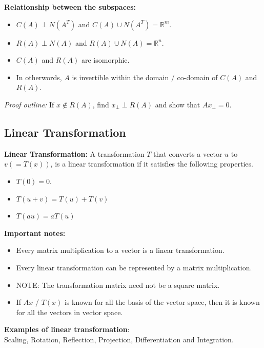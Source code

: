\begin{mdframed}[backgroundcolor=SlateGray2!40,linecolor=Firebrick4]
\textbf{Relationship between the subspaces:}
\begin{itemize}
	\item $C(A) \perp N(A^T)$ and $C(A) \cup N(A^T) = \mathbb{R}^m$.
	\item $R(A) \perp N(A)$ and $R(A) \cup N(A) = \mathbb{R}^n$.
    \item $C(A)$ and $R(A)$ are isomorphic.
    \item In otherwords, $A$ is invertible within the domain / co-domain of 
            $C(A)$ and $R(A)$.
\end{itemize}
\textit{Proof outline:} If $x \notin R(A)$, find $x_{\perp} \perp R(A)$ and
show that $Ax_{\perp} = 0$.


\end{mdframed}

\subsection{Linear Transformation}

\textbf{Linear Transformation:} A transformation $T$ that converts a vector $u$ to $v (= T(x))$, is a linear transformation if it satisfies the following properties.
\begin{itemize}
	\item $T(0) = 0$.
	\item $T(u + v) = T(u) + T(v)$
	\item $T(au) = aT(u)$
\end{itemize}


\textbf{Important notes:}
\begin{itemize}
\item Every matrix multiplication to a vector is a linear transformation.
\item Every linear transformation can be represented by a matrix multiplication.
\item NOTE: The transformation matrix need not be a square matrix.
\item If $Ax$ / $T(x)$ is known for all the basis of the vector space, then it is known for all the vectors in vector space.
\end{itemize}

\textbf{Examples of linear transformation}:\\
Scaling, Rotation, Reflection, Projection, Differentiation and Integration.\\


